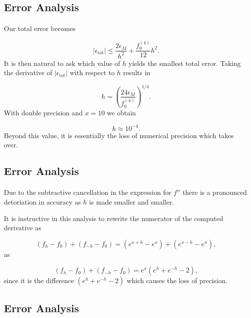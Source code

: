 \documentclass[%
twoside,                 %
final,                   %
10pt]{article}
\newenvironment{paragraphadmon}[1][]{\paragraph{#1}}{}
\begin{document}
\subsection{Error Analysis}


\begin{paragraphadmon}[]
Our total error becomes

\[
   \left|\epsilon_{\mbox{tot}}\right|\le  \frac{2 \epsilon_M}{h^2} +
                          \frac{f_0^{(4)}}{12}h^{2}.
    \label{eq:experror}
\]
It is then natural to ask which value of $h$ yields the smallest
total error. Taking the derivative of $\left|\epsilon_{\mbox{tot}}\right|$
with respect to $h$ results in

\[
   h= \left(\frac{ 24\epsilon_M}{f_0^{(4)}}\right)^{1/4}.
\]
With double precision and $x=10$ we obtain

\[
   h\approx 10^{-4}.
\]
Beyond this value, it is essentially the loss of numerical precision
which takes over.
\end{paragraphadmon}



\subsection{Error Analysis}


\begin{paragraphadmon}[]
Due to the subtractive cancellation in the expression
for $f''$ there is a pronounced detoriation in accuracy as $h$ is made smaller
and smaller.

It is instructive in this analysis to rewrite the numerator of
the computed derivative as

\[
   (f_h -f_0) +(f_{-h}-f_0)=(e^{x+h}-e^{x}) + (e^{x-h}-e^{x}),
\]
as

\[
   (f_h -f_0) +(f_{-h}-f_0)=e^x(e^{h}+e^{-h}-2),
\]
since it is the difference $(e^{h}+e^{-h}-2)$ which causes
the loss of precision.
\end{paragraphadmon}



\subsection{Error Analysis}
\end{document}
